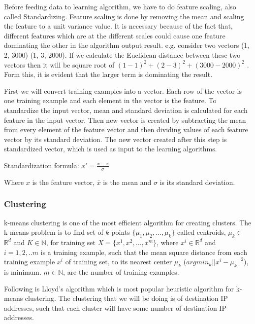 \documentclass[12pt,oneside,a4paper]{article}
\begin{document}
Before feeding data to learning algorithm, we have to do feature scaling, also called Standardizing. Feature scaling is done by removing the mean and scaling the feature to a unit variance value. It is necessary because of the fact that, different features which are at the different scales could cause one feature dominating the other in the algorithm output result. e.g. consider two vectors (1, 2, 3000) (1, 3, 2000). If we calculate the Euclidean distance between these two vectors then it will be square root of $(1-1)^2 + (2-3)^2 + (3000-2000)^2$ . Form this, it is evident that the larger term is dominating the result.

First we will convert training examples into a vector. Each row of the vector is one training example and each element in the vector is the feature. To standardize the input vector, mean and standard deviation is calculated for each feature in the input vector. Then new vector is created by subtracting the mean from every element of the feature vector and then dividing values of each feature vector by its standard deviation. The new vector created after this step is standardized vector, which is used as input to the learning algorithms.

\hspace{2cm} Standardization formula: $x' = \frac{x - \bar{x}}{\sigma}$

Where $x$ is the feature vector, ${\bar{x}}$ is the mean and $\sigma$  is its standard deviation.

\subsubsection{Clustering}

k-means clustering is one of the most efficient algorithm for creating clusters. The k-means problem is to find set of $k$ points $\{\mu_{1}, \mu_{2}, ..., \mu_{k}\}$ called centroids, $\mu_{k}\in$ $\mathbb{R}^d$ and $K \in \mathbb{N}$, for training set $X = \{x^{1}, x^{2}, ..., x^{m}\}$, where $x^{i} \in \mathbb{R}^d$
and $i= {1,2, ..m}$ is a training example, such that the mean square distance from each training example $x^{i}$ of training set, to its nearest center $\mu_{k}$ ($argmin_{k} || x^{i} {-} \mu_{k} ||^{2}$), is minimum. $m \in \mathbb{N}$, are the number of training examples.\cite{k-means-clustering}

Following is Lloyd's algorithm  which is most popular heuristic algorithm for k-means clustering. The clustering that we will be doing is of destination IP addresses, such that each cluster will have some number of destination IP addresses.
\end{document}
